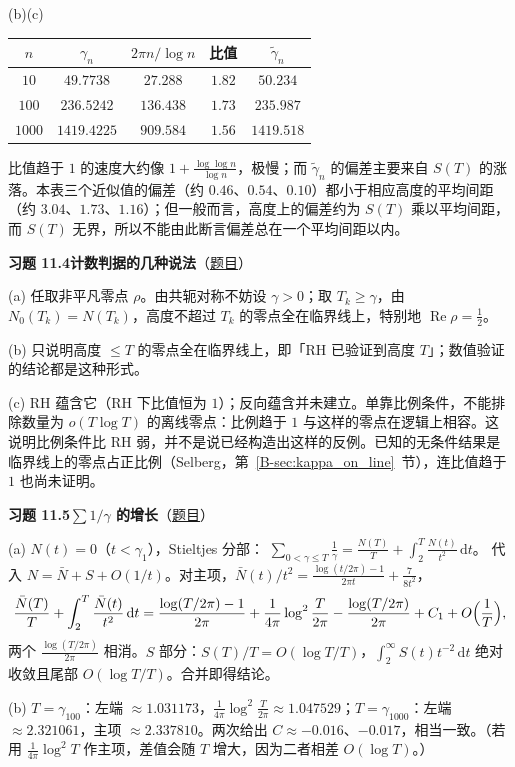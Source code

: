 \documentclass[11pt,a4paper]{article}
\newcommand{\dd}{\,\mathrm{d}}
\renewcommand{\Re}{\operatorname{Re}}
\newcommand{\bref}[1]{\ref*{B-#1}}
\newcommand{\Sol}[2]{%
  \par\addvspace{1.2em}\noindent
  \hypertarget{s:#1}{}\textbf{习题 #1\quad #2}\hfill{\small（\hyperlink{q:#1}{题目}）}\par
  \nopagebreak\smallskip}
\begin{document}
(b)(c)
\begin{center}
\small
\begin{tabular}{@{}ccccc@{}}
\toprule
$n$ & $\gamma_n$ & $2\pi n/\log n$ & 比值 & $\tilde\gamma_n$ \\
\midrule
$10$ & $49.7738$ & $27.288$ & $1.82$ & $50.234$ \\
$100$ & $236.5242$ & $136.438$ & $1.73$ & $235.987$ \\
$1000$ & $1419.4225$ & $909.584$ & $1.56$ & $1419.518$ \\
\bottomrule
\end{tabular}
\end{center}
比值趋于 $1$ 的速度大约像 $1+\frac{\log\log n}{\log n}$，极慢；而 $\tilde\gamma_n$ 的偏差主要来自 $S(T)$ 的涨落。本表三个近似值的偏差（约 $0.46$、$0.54$、$0.10$）都小于相应高度的平均间距（约 $3.04$、$1.73$、$1.16$）；但一般而言，高度上的偏差约为 $S(T)$ 乘以平均间距，而 $S(T)$ 无界，所以不能由此断言偏差总在一个平均间距以内。

\Sol{11.4}{计数判据的几种说法}
(a) 任取非平凡零点 $\rho$。由共轭对称不妨设 $\gamma>0$；取 $T_k\ge\gamma$，由 $N_0(T_k)=N(T_k)$，高度不超过 $T_k$ 的零点全在临界线上，特别地 $\Re\rho=\frac12$。

(b) 只说明高度 $\le T$ 的零点全在临界线上，即「RH 已验证到高度 $T$」；数值验证的结论都是这种形式。

(c) RH 蕴含它（RH 下比值恒为 $1$）；反向蕴含并未建立。单靠比例条件，不能排除数量为 $o(T\log T)$ 的离线零点：比例趋于 $1$ 与这样的零点在逻辑上相容。这说明比例条件比 RH 弱，并不是说已经构造出这样的反例。已知的无条件结果是临界线上的零点占正比例（Selberg，第~\bref{sec:kappa_on_line}~节），连比值趋于 $1$ 也尚未证明。

\Sol{11.5}{$\sum1/\gamma$ 的增长}
(a) $N(t)=0$（$t<\gamma_1$），Stieltjes 分部：
$\sum_{0<\gamma\le T}\frac1\gamma=\frac{N(T)}T+\int_{2}^T\frac{N(t)}{t^2}\dd t$。
代入 $N=\bar N+S+O(1/t)$。对主项，$\bar N(t)/t^2=\frac{\log(t/2\pi)-1}{2\pi t}+\frac7{8t^2}$，
\[
  \frac{\bar N(T)}T+\int_2^T\frac{\bar N(t)}{t^2}\dd t
  =\frac{\log(T/2\pi)-1}{2\pi}+\frac1{4\pi}\log^2\frac T{2\pi}-\frac{\log(T/2\pi)}{2\pi}+C_1+O\Bigl(\frac1T\Bigr),
\]
两个 $\frac{\log(T/2\pi)}{2\pi}$ 相消。$S$ 部分：$S(T)/T=O(\log T/T)$，$\int_2^\infty S(t)t^{-2}\dd t$ 绝对收敛且尾部 $O(\log T/T)$。合并即得结论。

(b) $T=\gamma_{100}$：左端 $\approx1.031173$，$\frac1{4\pi}\log^2\frac T{2\pi}\approx1.047529$；$T=\gamma_{1000}$：左端 $\approx2.321061$，主项 $\approx2.337810$。两次给出 $C\approx-0.016$、$-0.017$，相当一致。（若用 $\frac1{4\pi}\log^2T$ 作主项，差值会随 $T$ 增大，因为二者相差 $O(\log T)$。）
\end{document}
